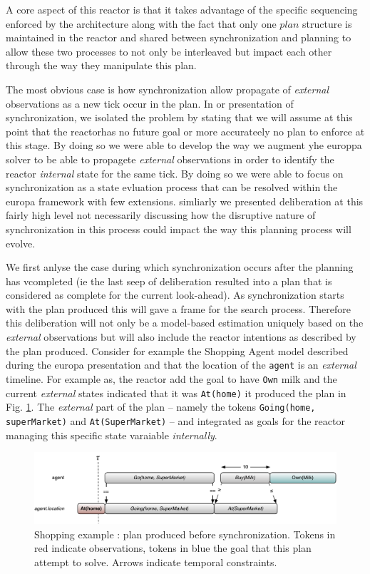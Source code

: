 A core aspect of this reactor is that it takes advantage of the
specific sequencing enforced by the \rx architecture along with the
fact that only one $plan$ structure is maintained in the reactor and
shared between synchronization and planning to allow these two
processes to not only be interleaved but impact each other through the
way they manipulate this plan.

The most obvious case is how synchronization allow propagate of {\em
  external} observations as a new tick occur in the plan. In or
presentation of synchronization, we isolated the problem by stating
that we will assume at this point that the reactorhas no future goal
or more accurateely no plan to enforce at this stage. By doing so we
were able to develop the way we augment yhe europpa solver to be able
to propagete {\em external} observations in order to identify the
reactor {\em internal} state for the same tick. By doing so we were
able to focus on synchronization as a state evluation process that can
be resolved within the europa framework with few extensions. simliarly
we presented deliberation at this fairly high level not necessarily
discussing how the disruptive nature of synchronization in this
process could impact the way this planning process will evolve.

We first anlyse the case during which synchronization occurs after the
planning has vcompleted (ie the last seep of deliberation resulted
into a plan that is considered as complete for the current
look-ahead). As synchronization starts with the plan produced this
will gave a frame for the search process. Therefore this deliberation
will not only be a model-based estimation uniquely based on the {\em
  external} observations but will also include the reactor intentions
as described by the plan produced. Consider for example the Shopping
Agent model described during the europa presentation and that the
location of the \texttt{agent} is an {\em external} timeline. For
example as, the reactor add the goal to have \texttt{Own} milk and the
current {\em external} states indicated that it was \texttt{At(home)}
it produced the plan in Fig. \ref{fig:shop:exec0}. The {\em external}
part of the plan -- namely the tokens \texttt{Going(home,
  superMarket)} and \texttt{At(SuperMarket)} -- and integrated as
goals for the reactor managing this specific state varaiable {\em
  internally}.

\begin{figure}[!htb]
  \centering
  \includegraphics[width=0.7\columnwidth]{figs/shoping_exec_t0}
  \caption{Shopping example : plan produced before synchronization. 
    Tokens in red indicate observations, 
    tokens in blue the goal that this plan attempt to solve. Arrows
    indicate temporal constraints.}
  \label{fig:shop:exec0}
\end{figure}

